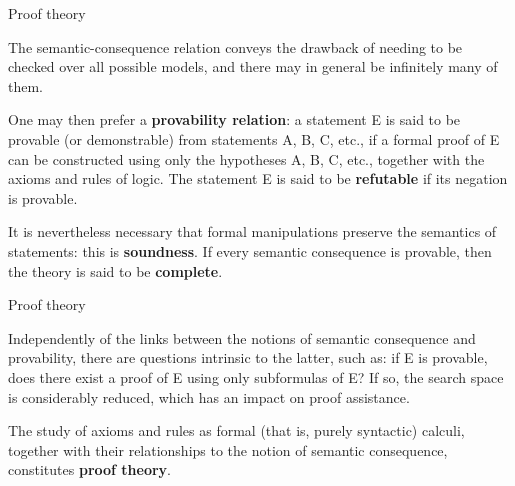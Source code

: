 \documentclass[compress,dvips,xcolor={dvipsnames},t]{beamer}
\begin{document}
%
\begin{frame}{Proof theory}

  The semantic-consequence relation conveys the drawback of needing to
  be checked over all possible models, and there may in general be
  infinitely many of them.

  \bigskip

  One may then prefer a \textbf{provability relation}: a statement E
  is said to be provable (or demonstrable) from statements A, B, C,
  etc., if a formal proof of E can be constructed using only the
  hypotheses A, B, C, etc., together with the axioms and rules of
  logic. The statement E is said to be \textbf{refutable} if its
  negation is provable.

  \bigskip

  It is nevertheless necessary that formal manipulations preserve the
  semantics of statements: this is \textbf{soundness}. If every
  semantic consequence is provable, then the theory is said to be
  \textbf{complete}.

\end{frame}

%
\begin{frame}{Proof theory}

Independently of the links between the notions of semantic
consequence and provability, there are questions intrinsic to the
latter, such as: if E is provable, does there exist a proof of E
using only subformulas of E? If so, the search space is
considerably reduced, which has an impact on proof assistance.

\bigskip

The study of axioms and rules as formal (that is, purely syntactic)
calculi, together with their relationships to the notion of semantic
consequence, constitutes \textbf{proof theory}.

\end{frame}
\end{document}
